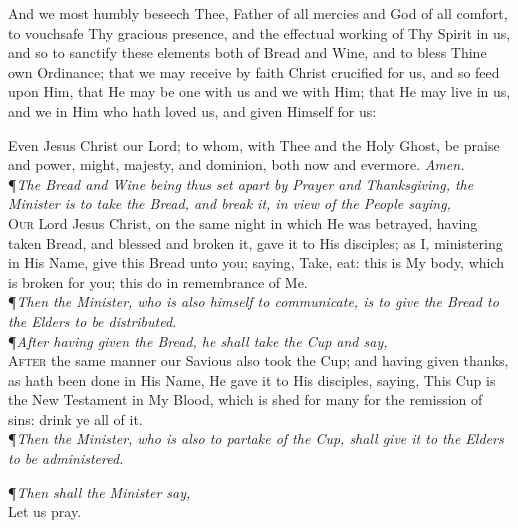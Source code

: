 And we most humbly beseech Thee, Father of all mercies and God of all comfort, to vouchsafe Thy gracious presence, and the effectual working of Thy Spirit in us, and so to sanctify these elements both of Bread and Wine, and to bless Thine own Ordinance; that we may receive by faith Christ crucified for us, and so feed upon Him, that He may be one with us and we with Him; that He may live in us, and we in Him who hath loved us, and given Himself for us:

Even Jesus Christ our Lord; to whom, with Thee and the Holy Ghost, be praise and power, might, majesty, and dominion, both now and evermore.
\textit{Amen.} \\ 

\noindent\P\textit{The Bread and Wine being thus set apart by Prayer and Thanksgiving, the Minister is to take the Bread, and break it, in view of the People saying,} \\

\lettrine{O}{ur} Lord Jesus Christ, on the same night in which He was betrayed, having taken Bread, and blessed and broken it, gave it to His disciples; as I, ministering in His Name, give this Bread unto you; saying, Take, eat: this is My body, which is broken for you; this do in remembrance of Me. \\

\noindent\P\textit{Then the Minister, who is also himself to communicate, is to give the Bread to the Elders to be distributed.} \\

\noindent\P\textit{After having given the Bread, he shall take the Cup and say,} \\

\lettrine{A}{fter} the same manner our Savious also took the Cup; and having given thanks, as hath been done in His Name, He gave it to His disciples, saying, This Cup is the New Testament in My Blood, which is shed for many for the remission of sins: drink ye all of it. \\

\noindent\P\textit{Then the Minister, who is also to partake of the Cup, shall give it to the Elders to be administered.} \\

\begin{center}
\P\textit{Then shall the Minister say,} \\
\vspace{1ex}
Let us pray. \\
\end{center}

